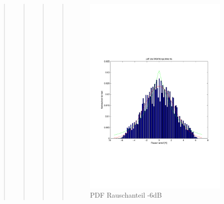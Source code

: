 \begin{quote}
\begin{quote}
\begin{quote}
\begin{quote}
        \begin{figure}[H]
        \centering
            \includegraphics[scale=0.6, trim = 1cm 6.5cm 1cm 7.5cm, clip]{./Bilder/PDFRauschen-6dB}
                \caption{PDF Rauschanteil -6dB}
        \end{figure}
        

\end{quote}
\end{quote}
\end{quote}
\end{quote}
